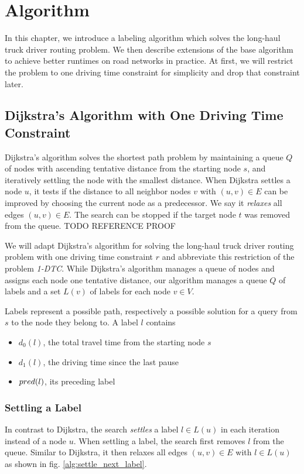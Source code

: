 
\chapter{Algorithm}
\label{ch:Algorithm}
In this chapter, we introduce a labeling algorithm which solves the long-haul truck driver routing problem. We then describe extensions of the base algorithm to achieve better runtimes on road networks in practice. At first, we will restrict the problem to one driving time constraint for simplicity and drop that constraint later.

\section{Dijkstra's Algorithm with One Driving Time Constraint}
Dijkstra's algorithm solves the shortest path problem by maintaining a queue $Q$ of nodes with ascending tentative distance from the starting node $s$, and iteratively settling the node with the smallest distance. When Dijkstra settles a node $u$, it tests if the distance to all neighbor nodes $v$ with $(u,v) \in E$ can be improved by choosing the current node as a predecessor. We say it \emph{relaxes} all edges $(u,v) \in E$. The search can be stopped if the target node $t$ was removed from the queue. TODO REFERENCE PROOF

We will adapt Dijkstra's algorithm for solving the long-haul truck driver routing problem with one driving time constraint $r$ and abbreviate this restriction of the problem \emph{1-DTC}. While Dijkstra's algorithm manages a queue of nodes and assigns each node one tentative distance, our algorithm manages a queue $Q$ of labels and a set $L(v)$ of labels for each node $v \in V$.

Labels represent a possible path, respectively a possible solution for a query from $s$ to the node they belong to. A label $l$ contains

\begin{itemize}
	\item $d_0(l)$, the total travel time from the starting node $s$
	\item $d_1(l)$, the driving time since the last pause
	\item $pred(l)$, its preceding label
\end{itemize}

\subsection{Settling a Label}
In contrast to Dijkstra, the search \emph{settles} a label $l \in L(u)$ in each iteration instead of a node $u$. When settling a label, the search first removes $l$ from the queue. Similar to Dijkstra, it then relaxes all edges $(u,v) \in E$ with $l \in L(u)$ as shown in fig. \ref{alg:settle_next_label}.


